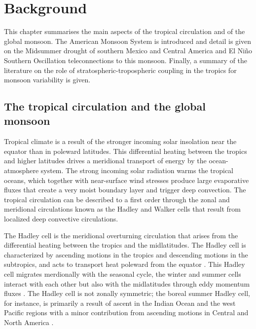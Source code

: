 

\chapter{\label{ch:2-litreview}Background}

\minitoc
 This chapter summarises the main aspects of the tropical circulation and of the global monsoon. The American Monsoon System is introduced and detail is given on the Midsummer drought of southern Mexico and Central America and El Niño Southern Oscillation teleconnections to this monsoon. Finally, a summary of the literature on the role of stratospheric-tropospheric coupling in the tropics for monsoon variability is given. %
\section{The tropical circulation and the global monsoon}\label{sq:bk_tropics}

Tropical climate is a result of the stronger incoming solar insolation near the equator than in poleward latitudes. %
This differential heating between the tropics and higher latitudes drives a meridional transport of energy by the ocean-atmosphere system.
The strong incoming solar radiation warms the tropical oceans, which together with near-surface wind stresses produce large evaporative fluxes that create a very moist boundary layer and trigger deep convection. %
The tropical circulation can be described to a first order through the zonal and meridional circulations known as the Hadley and Walker cells that result from localized deep convective circulations.
 
The Hadley cell is the meridional overturning circulation that arises from the differential heating between the tropics and the midlatitudes. The Hadley cell is characterized by ascending motions in the tropics and descending motions in the subtropics, and acts to transport heat poleward from the equator \citep{lorenz1967}.  This Hadley cell migrates merdionally with the seasonal cycle, the winter and summer cells interact with each other but also with the midlatitudes through eddy momentum fluxes \citep{bordoni2008monsoons}. 
The Hadley cell is not zonally symmetric; the boreal summer Hadley cell, for instance,  is primarily a result of ascent in the Indian Ocean and the west Pacific regions with a minor contribution from ascending motions in Central and North America \citep{hoskins2020}. 

